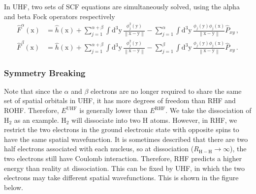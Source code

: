 \documentclass{article}
\theoremstyle{plain}\theoremheaderfont{\normalfont\itshape}\theorembodyfont{\rmfamily}\theoremseparator{.}\newtheorem*{rem}{Remark}\newtheorem*{ex}{Example}\newtheorem*{proof}{Proof}\newtheorem*{altp}{Alternative proof}
\theoremstyle{plain}\theoremheaderfont{\normalfont\bfseries}\theorembodyfont{\rmfamily}\theoremseparator{.}\newtheorem{thm}{Theorem}[section]\newtheorem{lem}[thm]{Lemma}\newtheorem{prop}[thm]{Proposition}\newtheorem*{cor}{Corollary}\newtheorem{defn}[thm]{Definition}\newtheorem{clm}[thm]{Claim}\newtheorem{clminproof}{Claim}
\theoremstyle{break}\theoremheaderfont{\normalfont\itshape}\theorembodyfont{\rmfamily}\theoremseparator{.\medskip}\newtheorem*{proofskip}{Proof}\newtheorem*{exs}{Examples}\newtheorem*{rems}{Remarks}
\theoremstyle{break}\theoremheaderfont{\normalfont\bfseries}\theorembodyfont{\rmfamily}\theoremseparator{.\medskip}\newtheorem{lemskip}[thm]{Lemma}\newtheorem{defnskip}[thm]{Definition}\newtheorem{propskip}[thm]{Proposition}\newtheorem{thmskip}[thm]{Theorem}
\numberwithin{equation}{section}
\newcommand{\dd}[2][]{\mathrm{d}^{#1} #2\,}
\newcommand{\vb}[1]{\bm{\mathrm{#1}}}
\newcommand{\norm}[1]{\left\| #1 \right\|}
\begin{document}
    In UHF, two sets of SCF equations are simultaneously solved, using the alpha and beta Fock operators respectively
    \begin{align}
        \hat{F}^{\alpha}(\vb{x})&=\hat{h}(\vb{x})+\sum_{j=1}^{\alpha+\beta}\int\dd[3]{\vb{y}}\frac{\phi_j^2(\vb{y})}{\norm{\vb{x}-\vb{y}}}-\sum_{j=1}^{\alpha}\int\dd[3]{\vb{y}}\frac{\phi_j(\vb{y})\phi_j(\vb{x})}{\norm{\vb{x}-\vb{y}}}\hat{P}_{xy}\,,\\
        \hat{F}^{\beta}(\vb{x})&=\hat{h}(\vb{x})+\sum_{j=1}^{\alpha+\beta}\int\dd[3]{\vb{y}}\frac{\phi_j^2(\vb{y})}{\norm{\vb{x}-\vb{y}}}-\sum_{j=1}^{\beta}\int\dd[3]{\vb{y}}\frac{\phi_j(\vb{y})\phi_j(\vb{x})}{\norm{\vb{x}-\vb{y}}}\hat{P}_{xy}\,.
    \end{align}
    \subsubsection{Symmetry Breaking}
    Note that since the \(\alpha\) and \(\beta\) electrons are no longer required to share the same set of spatial orbitals in UHF, it has more degrees of freedom than RHF and ROHF. Therefore, \(E^{\text{UHF}}\) is generally lower than \(E^{\text{RHF}}\). We take the dissociation of \(\mathrm{H}_2\) as an example. \(\mathrm{H}_2\) will dissociate into two H atoms. However, in RHF, we restrict the two electrons in the ground electronic state with opposite spins to have the same spatial wavefunction. It is sometimes described that there are two half electrons associated with each nucleus, so at dissociation (\(R_{\mathrm{H-H}}\to\infty\)), the two electrons still have Coulomb interaction. Therefore, RHF predicts a higher energy than reality at dissociation. This can be fixed by UHF, in which the two electrons may take different spatial wavefunctions. This is shown in the figure below.
\end{document}
